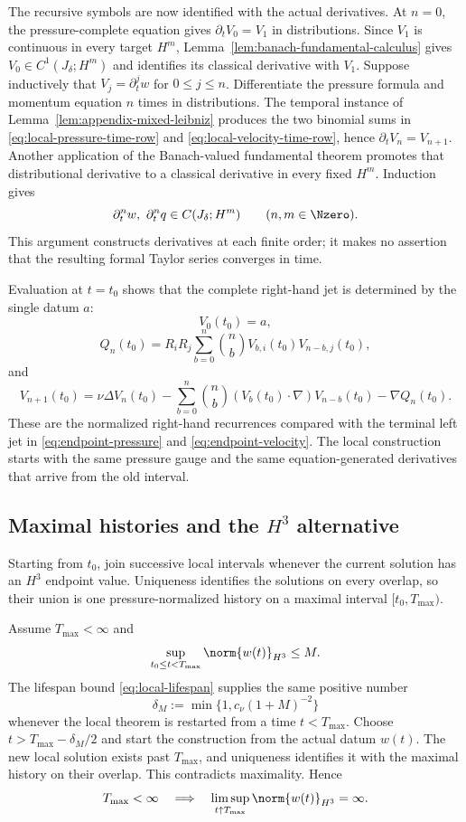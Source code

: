 The recursive symbols are now identified with the actual derivatives.
At \(n=0\), the pressure-complete equation gives \(\partial_tV_0=V_1\) in distributions.
Since \(V_1\) is continuous in every target \(H^m\), Lemma~\ref{lem:banach-fundamental-calculus} gives \(V_0\in C^1(J_\delta;H^m)\) and identifies its classical derivative with \(V_1\).
Suppose inductively that \(V_j=\partial_t^jw\) for \(0\le j\le n\).
Differentiate the pressure formula and momentum equation \(n\) times in distributions.
The temporal instance of Lemma~\ref{lem:appendix-mixed-leibniz} produces the two binomial sums in \eqref{eq:local-pressure-time-row} and \eqref{eq:local-velocity-time-row}, hence \(\partial_tV_n=V_{n+1}\).
Another application of the Banach-valued fundamental theorem promotes that distributional derivative to a classical derivative in every fixed \(H^m\).
Induction gives
\[
 \partial_t^nw,\ \partial_t^nq
 \in C(J_\delta;H^m)
 \qquad(n,m\in\Nzero).
\]
This argument constructs derivatives at each finite order; it makes no assertion that the resulting formal Taylor series converges in time.

Evaluation at \(t=t_0\) shows that the complete right-hand jet is determined by the single datum \(a\):
\[
 V_0(t_0)=a,
\]
\[
 Q_n(t_0)
 =R_iR_j\sum_{b=0}^{n}\binom nb
 V_{b,i}(t_0)V_{n-b,j}(t_0),
\]
and
\[
 V_{n+1}(t_0)
 =\nu\Delta V_n(t_0)
 -\sum_{b=0}^{n}\binom nb
 (V_b(t_0)\cdot\nabla)V_{n-b}(t_0)
 -\nabla Q_n(t_0).
\]
These are the normalized right-hand recurrences compared with the terminal left jet in \eqref{eq:endpoint-pressure} and \eqref{eq:endpoint-velocity}.
The local construction starts with the same pressure gauge and the same equation-generated derivatives that arrive from the old interval.

\subsection{\texorpdfstring{Maximal histories and the \(H^3\) alternative}{Maximal histories and the H3 alternative}}

Starting from \(t_0\), join successive local intervals whenever the current solution has an \(H^3\) endpoint value.
Uniqueness identifies the solutions on every overlap, so their union is one pressure-normalized history on a maximal interval \([t_0,T_{\max})\).

Assume \(T_{\max}<\infty\) and
\[
 \sup_{t_0\le t<T_{\max}}\norm{w(t)}_{H^3}\le M.
\]
The lifespan bound \eqref{eq:local-lifespan} supplies the same positive number
\[
 \delta_M:=\min\{1,c_\nu(1+M)^{-2}\}
\]
whenever the local theorem is restarted from a time \(t<T_{\max}\).
Choose \(t>T_{\max}-\delta_M/2\) and start the construction from the actual datum \(w(t)\).
The new local solution exists past \(T_{\max}\), and uniqueness identifies it with the maximal history on their overlap.
This contradicts maximality.
Hence
\[
 T_{\max}<\infty
 \quad\Longrightarrow\quad
 \limsup_{t\uparrow T_{\max}}\norm{w(t)}_{H^3}=\infty.
\]

